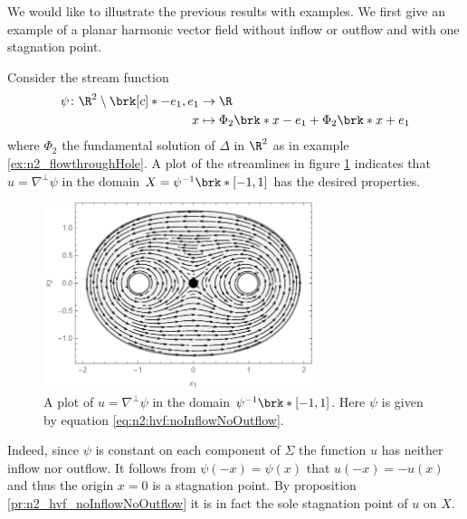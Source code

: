 We would like to illustrate the previous results with examples.
We first give an example of a planar harmonic vector field without 
inflow or outflow and with one stagnation point.
\begin{example}[No in- or outflow]
  Consider the stream function
  \begin{equation}
    \begin{aligned}
    \psi\colon\R^2\setminus\brk[c]*{-e_1,e_1}&\to\R \\
    x&\mapsto\Phi_2\brk*{x-e_1}+\Phi_2\brk*{x+e_1}
    \end{aligned}\label{eq:n2:hvf:noInflowNoOutflow}
  \end{equation}
  where $\Phi_2$ the fundamental solution of $\Delta$ in $\R^2$ as in example \ref{ex:n2_flowthroughHole}.
  A plot of the streamlines in figure \ref{pl:n2_hvf_noInflowNoOutflow}
  indicates that $u=\nabla^\perp\psi$
  in the domain $X=\psi^{-1}\brk*{[-1,1]}$ has the desired properties.
  \begin{figure}
    \centering
    \includegraphics[width=0.7\textwidth]{../Plots/n2_hvf_noInflowNoOutflow_symmetric_gray_2.pdf}
    \caption{A plot of $u=\nabla^\perp\psi$ in the domain $\psi^{-1}\brk*{[-1,1]}$.
      Here $\psi$ is given by equation \eqref{eq:n2:hvf:noInflowNoOutflow}.}
    \label{pl:n2_hvf_noInflowNoOutflow}
  \end{figure}
  Indeed, since $\psi$ is constant on each component of $\Sigma$ the function $u$ has 
  neither inflow nor outflow.
  It follows from $\psi(-x)=\psi(x)$ that $u(-x)=-u(x)$ 
  and thus the origin $x=0$ is a stagnation point.
  By proposition \ref{pr:n2_hvf_noInflowNoOutflow} it is in fact the
  sole stagnation point of $u$ on $X$.
\end{example}

